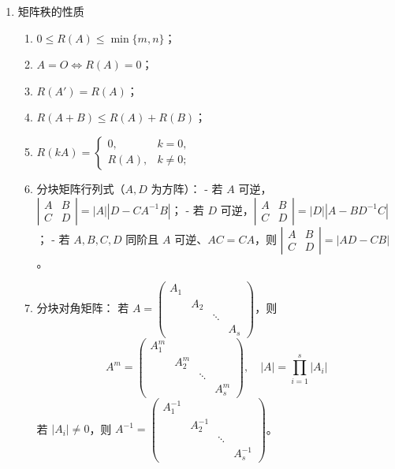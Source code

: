 \documentclass[UTF8]{ctexart}
\theoremstyle{remark}
\begin{document}
\begin{enumerate}
\item 矩阵秩的性质  
\begin{enumerate}
	\item \(0 \leq R(A) \leq \min\{m, n\}\)；  
	\item \(A = O \Leftrightarrow R(A) = 0\)；  
	\item \(R(A') = R(A)\)；  
	\item \(R(A + B) \leq R(A) + R(B)\)；  
	\item \(R(kA) = 
	\begin{cases} 
		0, & k = 0, \\
		R(A), & k \neq 0;
	\end{cases}\)  
	\item 分块矩阵行列式（\(A, D\) 为方阵）：  
	- 若 \(A\) 可逆，\(\left|\begin{array}{ll} A & B \\ C & D \end{array}\right| = |A|\left|D - CA^{-1}B\right|\)；  
	- 若 \(D\) 可逆，\(\left|\begin{array}{ll} A & B \\ C & D \end{array}\right| = |D|\left|A - BD^{-1}C\right|\)；  
	- 若 \(A, B, C, D\) 同阶且 \(A\) 可逆、\(AC = CA\)，则 \(\left|\begin{array}{ll} A & B \\ C & D \end{array}\right| = |AD - CB|\)。  
	\item 分块对角矩阵：  
	若 \(A = \left(\begin{array}{llll} A_1 & & & \\ & A_2 & & \\ & & \ddots & \\ & & & A_s \end{array}\right)\)，则  
	\[
	A^m = \left(\begin{array}{llll} A_1^m & & & \\ & A_2^m & & \\ & & \ddots & \\ & & & A_s^m \end{array}\right), \quad |A| = \prod_{i=1}^s |A_i|
	\]  
	若 \(|A_i| \neq 0\)，则 \(A^{-1} = \left(\begin{array}{llll} A_1^{-1} & & & \\ & A_2^{-1} & & \\ & & \ddots & \\ & & & A_s^{-1} \end{array}\right)\)。  
\end{enumerate}
\end{enumerate}
\end{document}
